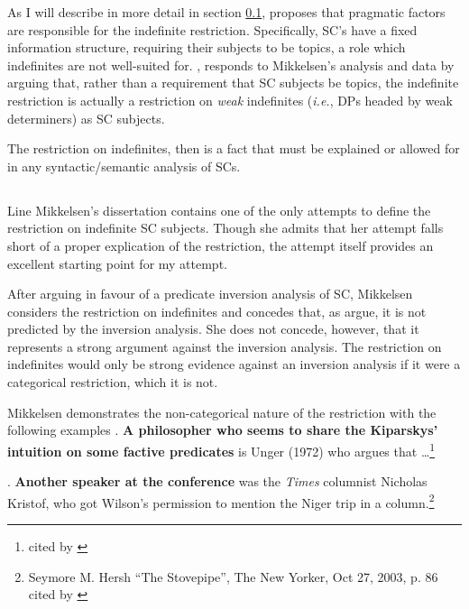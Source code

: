 \documentclass[letterpaper]{article}
\begin{document}
As I will describe in more detail in section \ref{sec:Mikkelsen}, \textcite{mikkelsen2005copular} proposes that pragmatic factors are responsible for the indefinite restriction.
Specifically, SC's have a fixed information structure, requiring their subjects to be topics, a role which indefinites are not well-suited for.
\textcite{heycock2012specification}, responds to Mikkelsen's analysis and data  by arguing that, rather than a requirement that SC subjects be topics, the indefinite restriction is actually a restriction on \textit{weak} indefinites (\textit{i.e.}, DPs headed by weak determiners) as SC subjects.

The restriction on indefinites, then is a fact that must be explained or allowed for in any syntactic/semantic analysis of SCs.

\subsection{\textcite{mikkelsen2005copular}}\label{sec:Mikkelsen}
Line Mikkelsen's dissertation \parencite[published as][]{mikkelsen2005copular} contains one of the only attempts to define the restriction on indefinite SC subjects.
Though she admits that her attempt falls short of a proper explication of the restriction, the attempt itself provides an excellent starting point for my attempt.

After arguing in favour of a predicate inversion analysis of SC, Mikkelsen considers the restriction on indefinites and concedes that, as \textcite{heycockkroch1999pseudocleft} argue, it is not predicted by the inversion analysis.
She does not concede, however, that it represents a strong argument against the inversion analysis.
The restriction on indefinites would only be strong evidence against an inversion analysis if it were a categorical restriction, which it is not.

Mikkelsen demonstrates the non-categorical nature of the restriction with the following examples
\ex.\label{ex:MikkPhilosopher} \textbf{A philosopher who seems to share the Kiparskys' intuition on some factive predicates} is Unger (1972) who argues that \dots\footnote{\textcite[][p. 195 fn8]{delacruz1976factives} cited by \textcite[117]{mikkelsen2005copular}}

\ex.\label{ex:MikkSpeaker} \textbf{Another speaker at the conference} was the \textit{Times} columnist Nicholas Kristof, who got Wilson's permission to mention the Niger trip in a column.\footnote{Seymore M. Hersh ``The Stovepipe'', The New Yorker, Oct 27, 2003, p. 86 cited by \textcite[118]{mikkelsen2005copular}}
\end{document}
